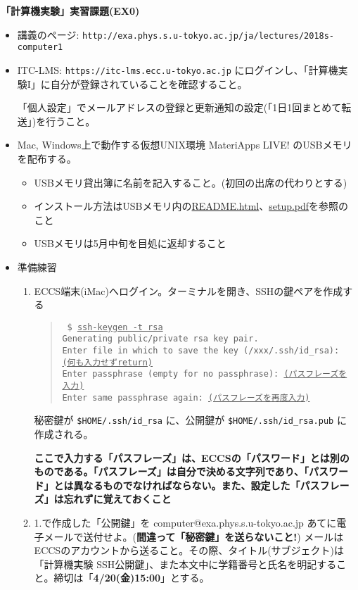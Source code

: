 \documentclass[11pt]{jarticle}
\begin{document}
\noindent
{\bf\large 「計算機実験」実習課題(EX0)}
\\[-0.5em]

\noindent
\begin{itemize}
\item 講義のページ: \verb+http://exa.phys.s.u-tokyo.ac.jp/ja/lectures/2018s-computer1+
\item ITC-LMS: \verb+https://itc-lms.ecc.u-tokyo.ac.jp+ にログインし、「計算機実験I」に自分が登録されていることを確認すること。

  「個人設定」でメールアドレスの登録と更新通知の設定(「1日1回まとめて転送」)を行うこと。
\item Mac, Windows上で動作する仮想UNIX環境 MateriApps LIVE! のUSBメモリを配布する。
  \begin{itemize}
  \item USBメモリ貸出簿に名前を記入すること。(初回の出席の代わりとする)
  \item インストール方法はUSBメモリ内の\href{https://github.com/cmsi/MateriAppsLive/wiki/MateriAppsLive-ltx}{README.html}、\href{https://github.com/cmsi/MateriAppsLive-setup/blob/master/ova/setup.pdf}{setup.pdf}を参照のこと
  \item USBメモリは5月中旬を目処に返却すること
  \end{itemize}

\item 準備練習
  \begin{enumerate}
  \item ECCS端末(iMac)へログイン。ターミナルを開き、SSHの鍵ペアを作成する
    \begin{quote} \tt
      \$ \underline{ssh-keygen -t rsa} \\
      Generating public/private rsa key pair.\\
      Enter file in which to save the key (/xxx/.ssh/id\_rsa): \underline{(何も入力せずreturn)}\\
      Enter passphrase (empty for no passphrase): \underline{(パスフレーズを入力)}\\
      Enter same passphrase again: \underline{(パスフレーズを再度入力)}
    \end{quote}
    秘密鍵が {\tt \$HOME/.ssh/id\_rsa} に、公開鍵が {\tt \$HOME/.ssh/id\_rsa.pub} に作成される。
    
    {\bf ここで入力する「パスフレーズ」は、ECCSの「パスワード」とは別のものである。「パスフレーズ」は自分で決める文字列であり、「パスワード」とは異なるものでなければならない。また、設定した「パスフレーズ」は忘れずに覚えておくこと}
  \item 1.で作成した「公開鍵」を computer@exa.phys.s.u-tokyo.ac.jp あてに電子メールで送付せよ。({\bf 間違って「秘密鍵」を送らないこと!}) メールはECCSのアカウントから送ること。その際、タイトル(サブジェクト)は「計算機実験 SSH公開鍵」、また本文中に学籍番号と氏名を明記すること。締切は「{\bf 4/20(金)15:00}」とする。


\end{enumerate}
\end{itemize}
\end{document}
